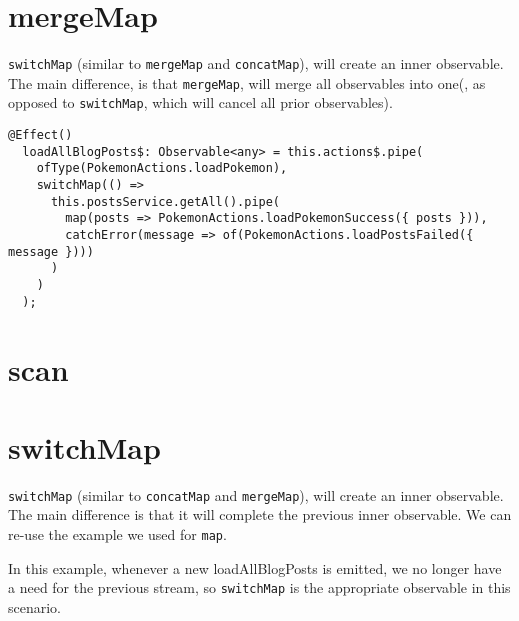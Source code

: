 \section{mergeMap}
\lstinline{switchMap} (similar to \lstinline{mergeMap} and \lstinline{concatMap}),
will create an inner observable. The main difference, is that \lstinline{mergeMap},
will merge all observables into one(, as opposed to \lstinline{switchMap}, 
which will cancel all prior observables). 

\begin{lstlisting}[caption=mergeMap example]
  @Effect()
  loadAllBlogPosts$: Observable<any> = this.actions$.pipe(
    ofType(PokemonActions.loadPokemon),
    switchMap(() =>
      this.postsService.getAll().pipe(
        map(posts => PokemonActions.loadPokemonSuccess({ posts })),
        catchError(message => of(PokemonActions.loadPostsFailed({ message })))
      )
    )
  );  
\end{lstlisting}

\section{scan}

\section{switchMap}
\lstinline{switchMap} (similar to \lstinline{concatMap} and \lstinline{mergeMap}),
will create an inner observable. The main difference is that it will complete 
the previous inner observable. We can re-use the example we used for 
\lstinline{map}. 

In this example, whenever a new loadAllBlogPosts is emitted, we no longer 
have a need for the previous stream, so \lstinline{switchMap} is the 
appropriate observable in this scenario. 
